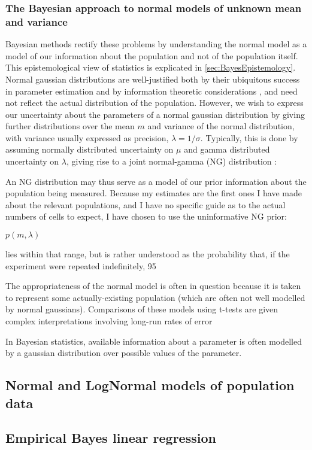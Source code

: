 \subsubsection{The Bayesian approach to normal models of unknown mean and variance}
Bayesian methods rectify these problems by understanding the normal model as a model of our information about the population and not of the population itself. This epistemological view of statistics is explicated in \autoref{sec:BayesEpistemology}. Normal gaussian distributions are well-justified both by their ubiquitous success in parameter estimation and by information theoretic considerations \cite{Jaynes2003}, and need not reflect the actual distribution of the population. However, we wish to express our uncertainty about the parameters of a normal gaussian distribution by giving further distributions over the mean $m$ and variance of the normal distribution, with variance usually expressed as precision, $\lambda = 1/\sigma$. Typically, this is done by  assuming normally distributed uncertainty on $\mu$ and gamma distributed uncertainty on $\lambda$, giving rise to a joint normal-gamma (NG) distribution \cite{Bernardo2000}:

An NG distribution may thus serve as a model of our prior information about the population being measured. Because my estimates are the first ones I have made about the relevant populations, and I have no specific guide as to the actual numbers of cells to expect, I have chosen to use the uninformative NG prior:

$p(m,\lambda)$

lies within that range, but is rather understood as the probability that, if the experiment were repeated indefinitely, 95

The appropriateness of the normal model is often in question because it is taken to represent some actually-existing population (which are often not well modelled by normal gaussians). Comparisons of these models using t-tests are given complex interpretations involving long-run rates of error

In Bayesian statistics, available information about a parameter is often modelled by a gaussian distribution over possible values of the parameter. 
\subsection{Normal and LogNormal models of population data}
\label{ssec:NormalModels}

\subsection{Empirical Bayes linear regression}
\label{ssec:EmpiricalBayes}


